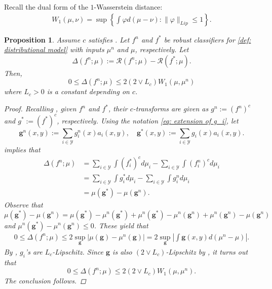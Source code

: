 \documentclass{amsart}
\theoremstyle{plain}
\numberwithin{equation}{section}\newtheorem{theorem}{Theorem}[section]
\newtheorem{proposition}[theorem]{Proposition}
\theoremstyle{remark}
\begin{document}
Recall the dual form of the $1$-Wasserstein distance:
\begin{align*}
    W_1(\mu,\nu) =\sup \left\{ \int \varphi d(\mu -\nu) :  \| \varphi \|_{Lip} \leq 1 \right\}.
\end{align*}



\begin{proposition}\label{prop: generalization error for Lischitz cost}
Assume $c$ satisfies . Let $f^n$ and $f^*$ be robust classifiers for \eqref{def: distributional model} with inputs $\mu^n$ and $\mu$, respectively. Let
\[
    \Delta(f^n;\mu):=\mathscr{R}(f^n; \mu) - \mathscr{R}(f^*; \mu).
\]
Then, 
\[
   0 \leq \Delta(f^n;\mu) \leq 2 (2 \vee L_c) W_1(\mu, \mu^n)
\]
where $L_c > 0$ is a constant depending on $c$.



\begin{proof}
Recalling , given $f^n$ and $f^*$, their $c$-transforms are given as $g^n := (f^n)^c$ and $g^*:=(f^*)^c$, respectively. Using the notation \eqref{eq: extension of g_i}, let
\[
    \bm{g}^n(x,y) := \sum_{i \in \mathcal{Y}}g^n_i(x) a_i(x,y), \quad \bm{g}^*(x,y) := \sum_{i \in \mathcal{Y}}g_i(x) a_i(x,y).
\]
 implies that
\begin{align*}
    \Delta(f^n;\mu)&= \sum_{i \in \mathcal{Y}} \int (f^*_i)^c d\mu_i - \sum_{i \in \mathcal{Y}} \int (f^n_i)^c d\mu_i\\
    &= \sum_{i \in \mathcal{Y}} \int g^*_i d\mu_i - \sum_{i \in \mathcal{Y}} \int g^n_i d\mu_i\\
    &= \mu(\bm{g}^*) - \mu(\bm{g}^n).
\end{align*}
Observe that
\[
    \mu(\bm{g}^*) - \mu(\bm{g}^n) =  \mu(\bm{g}^*) - \mu^n(\bm{g}^*) + \mu^n(\bm{g}^*) - \mu^n(\bm{g}^n) + \mu^n(\bm{g}^n) - \mu( \bm{g}^n)
\]    
and $\mu^n(\bm{g}^*) - \mu^n(\bm{g}^n) \leq 0$. These yield that
\begin{align*}
    0 \leq \Delta(f^n;\mu) \leq 2 \sup_{\bm{g}} \left| \mu(\bm{g}) - \mu^n(\bm{g}) \right| = 2 \sup_{\bm{g}} \left| \int \bm{g}(x,y)d ( \mu^n - \mu) \right|.
\end{align*}
By , $g_i$'s are $L_c$-Lipschitz. Since $\bm{g}$ is also $(2 \vee L_c)$-Lipschitz by , it turns out that
\[
    0 \leq \Delta(f^n;\mu) \leq 2 (2 \vee L_c) W_1(\mu, \mu^n).
\]
The conclusion follows.
\end{proof}
\end{proposition}
\end{document}
